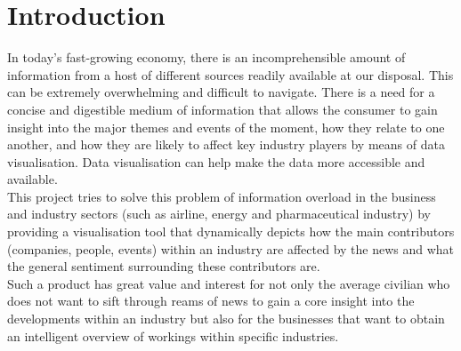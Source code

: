 \chapter{Introduction}

In today's fast-growing economy, there is an incomprehensible amount of information from a host of different sources readily available at our disposal. This can be extremely overwhelming and difficult to navigate. There is a need for a concise and digestible medium of information that allows the consumer to gain insight into the major themes and events of the moment, how they relate to one another, and how they are likely to affect key industry players by means of data visualisation. Data visualisation can help make the data more accessible and available. \\

This project tries to solve this problem of information overload in the business and industry sectors (such as airline, energy and pharmaceutical industry) by providing a visualisation tool that dynamically depicts how the main contributors (companies, people, events) within an industry are affected by the news and what the general sentiment surrounding these contributors are. \\

Such a product has great value and interest for not only the average civilian who does not want to sift through reams of news to gain a core insight into the developments within an industry but also for the businesses that want to obtain an intelligent overview of workings within specific industries. \\




